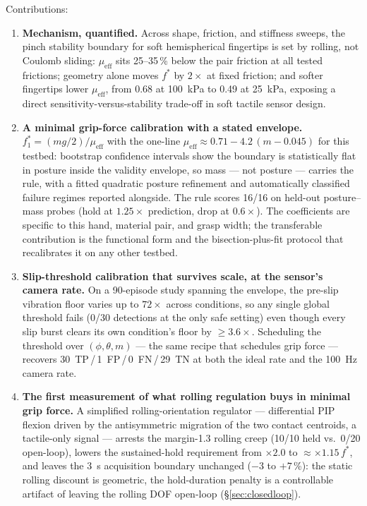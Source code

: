 \documentclass[journal]{IEEEtran}
\newcommand{\mueff}{\mu_{\mathrm{eff}}}
\newcommand{\fstar}{f^{*}}
\begin{document}
Contributions:
\begin{enumerate}
  \item \textbf{Mechanism, quantified.} Across shape, friction, and
    stiffness sweeps, the pinch stability boundary for soft hemispherical
    fingertips is set by rolling, not Coulomb sliding: $\mueff$ sits
    25--35\,\% below the pair friction at all tested frictions; geometry
    alone moves $\fstar$ by $2\times$ at fixed friction; and softer
    fingertips lower $\mueff$, from 0.68 at 100~kPa to 0.49 at 25~kPa,
    exposing a direct sensitivity-versus-stability trade-off in soft
    tactile sensor design.
  \item \textbf{A minimal grip-force calibration with a stated envelope.}
    $f_1^{*} = (mg/2)/\mueff$ with the one-line
    $\mueff \approx 0.71 - 4.2\,(m-0.045)$ for this testbed: bootstrap
    confidence intervals show the boundary is statistically flat in
    posture inside the validity envelope, so mass --- not posture ---
    carries the rule, with a fitted quadratic posture refinement and
    automatically classified failure regimes reported alongside. The rule
    scores 16/16 on held-out posture--mass probes (hold at $1.25\times$
    prediction, drop at $0.6\times$). The coefficients are specific to
    this hand, material pair, and grasp width; the transferable
    contribution is the functional form and the bisection-plus-fit
    protocol that recalibrates it on any other testbed.
  \item \textbf{Slip-threshold calibration that survives scale, at the
    sensor's camera rate.} On a 90-episode study spanning the envelope, the pre-slip
    vibration floor varies up to $72\times$ across conditions, so any
    single global threshold fails (0/30 detections at the only safe
    setting) even though every slip burst clears its own condition's floor
    by ${\ge}3.6\times$. Scheduling the threshold over $(\phi,\theta,m)$
    --- the same recipe that schedules grip force --- recovers
    30~TP\,/\,1~FP\,/\,0~FN\,/\,29~TN at both the ideal rate and the
    100~Hz camera rate.
  \item \textbf{The first measurement of what rolling regulation buys in
    minimal grip force.} A simplified rolling-orientation regulator ---
    differential PIP flexion driven by the antisymmetric migration of the
    two contact centroids, a tactile-only signal --- arrests the
    margin-1.3 rolling creep (10/10 held vs.\ 0/20 open-loop), lowers the
    sustained-hold requirement from $\times 2.0$ to
    ${\approx}\times 1.15\,\fstar$, and leaves the 3~s acquisition
    boundary unchanged ($-3$ to $+7$\,\%): the static rolling discount is
    geometric, the hold-duration penalty is a controllable artifact of
    leaving the rolling DOF open-loop (\S\ref{sec:closedloop}).
\end{enumerate}
\end{document}
